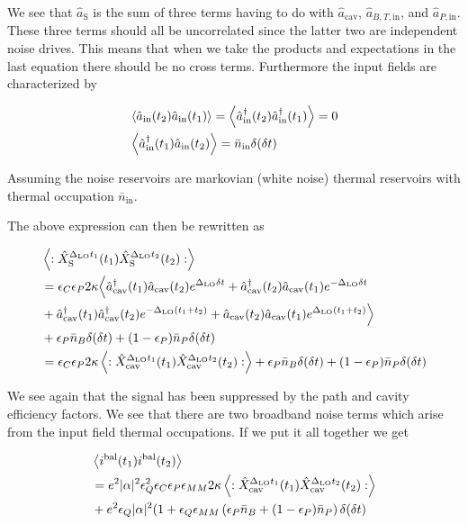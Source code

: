 \documentclass[12pt]{article}
\newcommand{\ep}{\epsilon}
\begin{document}
We see that $\hat{a}_{\text{S}}$ is the sum of three terms having to do with $\hat{a}_{\text{cav}}$, $\hat{a}_{B,T,\text{in}}$, and $\hat{a}_{P,\text{in}}$. These three terms should all be uncorrelated since the latter two are independent noise drives. This means that when we take the products and expectations in the last equation there should be no cross terms. Furthermore the input fields are characterized by

\begin{align}
&\Braket{\hat{a}_{\text{in}}(t_2)\hat{a}_{\text{in}}(t_1)} = \Braket{\hat{a}^{\dag}_{\text{in}}(t_2)\hat{a}^{\dag}_{\text{in}}(t_1)} = 0\\ 
& \Braket{\hat{a}^{\dag}_{\text{in}}(t_1)\hat{a}_{\text{in}}(t_2)} = \bar{n}_{\text{in}} \delta(\delta t)
\end{align}

Assuming the noise reservoirs are markovian (white noise) thermal reservoirs with thermal occupation $\bar{n}_{\text{in}}$.

The above expression can then be rewritten as

\begin{align}
&\Braket{:\hat{X}_{\text{S}}^{\Delta_{\text{LO}}t_1}(t_1)\hat{X}_{\text{S}}^{\Delta_{\text{LO}}t_2}(t_2) :}\\
&=\ep_C \ep_P 2\kappa \Big \langle \hat{a}^{\dag}_{\text{cav}}(t_1)\hat{a}_{\text{cav}}(t_2)e^{\Delta_{\text{LO}}\delta t} + \hat{a}^{\dag}_{\text{cav}}(t_2)\hat{a}_{\text{cav}}(t_1)e^{-\Delta_{\text{LO}}\delta t}\\
&+ \hat{a}^{\dag}_{\text{cav}}(t_1)\hat{a}^{\dag}_{\text{cav}}(t_2)e^{-\Delta_{\text{LO}}(t_1+t_2)} + \hat{a}_{\text{cav}}(t_2)\hat{a}_{\text{cav}}(t_1)e^{\Delta_{\text{LO}}(t_1+t_2)} \Big \rangle\\
&+\ep_P \bar{n}_B\delta(\delta t) + (1-\ep_P) \bar{n}_P \delta(\delta t)\\
&= \ep_C \ep_P 2 \kappa \Braket{:\hat{X}_{\text{cav}}^{\Delta_{\text{LO}}t_1}(t_1)\hat{X}_{\text{cav}}^{\Delta_{\text{LO}}t_2}(t_2) :} +\ep_P \bar{n}_B \delta(\delta t) + (1-\ep_P) \bar{n}_P \delta(\delta t)
\end{align}

We see again that the signal has been suppressed by the path and cavity efficiency factors. We see that there are two broadband noise terms which arise from the input field thermal occupations. If we put it all together we get

\begin{align}
&\Braket{i^{\text{bal}}(t_1)i^{\text{bal}}(t_2)}\\
&= e^2 |\alpha|^2 \ep_Q^2 \ep_C \ep_P \ep_{MM} 2\kappa \Braket{:\hat{X}_{\text{cav}}^{\Delta_{\text{LO}}t_1}(t_1)\hat{X}_{\text{cav}}^{\Delta_{\text{LO}}t_2}(t_2) :}\\
&+ e^2 \ep_Q |\alpha|^2(1+\ep_Q\ep_{MM}\left(\ep_P\bar{n}_B + (1-\ep_P)\bar{n}_P\right) \delta(\delta t)
\end{align}
\end{document}
